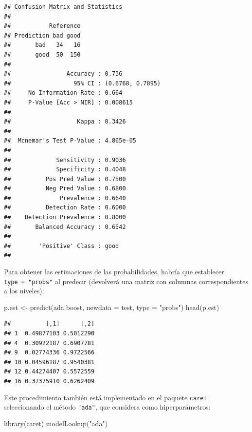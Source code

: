 \documentclass[
  spanish,
]{book}
\newenvironment{Shaded}{\begin{snugshade}}{\end{snugshade}}
\newcommand{\AttributeTok}[1]{\textcolor[rgb]{0.77,0.63,0.00}{#1}}
\newcommand{\FunctionTok}[1]{\textcolor[rgb]{0.00,0.00,0.00}{#1}}
\newcommand{\NormalTok}[1]{#1}
\newcommand{\OtherTok}[1]{\textcolor[rgb]{0.56,0.35,0.01}{#1}}
\newcommand{\StringTok}[1]{\textcolor[rgb]{0.31,0.60,0.02}{#1}}
\theoremstyle{break}
\theoremstyle{definition}
\theoremstyle{definition}
\theoremstyle{definition}
\theoremstyle{definition}
\theoremstyle{remark}
\begin{document}
\begin{verbatim}
## Confusion Matrix and Statistics
## 
##           Reference
## Prediction bad good
##       bad   34   16
##       good  50  150
##                                           
##                Accuracy : 0.736           
##                  95% CI : (0.6768, 0.7895)
##     No Information Rate : 0.664           
##     P-Value [Acc > NIR] : 0.008615        
##                                           
##                   Kappa : 0.3426          
##                                           
##  Mcnemar's Test P-Value : 4.865e-05       
##                                           
##             Sensitivity : 0.9036          
##             Specificity : 0.4048          
##          Pos Pred Value : 0.7500          
##          Neg Pred Value : 0.6800          
##              Prevalence : 0.6640          
##          Detection Rate : 0.6000          
##    Detection Prevalence : 0.8000          
##       Balanced Accuracy : 0.6542          
##                                           
##        'Positive' Class : good            
## 
\end{verbatim}

Para obtener las estimaciones de las probabilidades, habría que establecer \texttt{type\ =\ "probs"} al predecir (devolverá una matriz con columnas correspondientes a los niveles):

\begin{Shaded}
\begin{Highlighting}[]
\NormalTok{p.est }\OtherTok{\textless{}{-}} \FunctionTok{predict}\NormalTok{(ada.boost, }\AttributeTok{newdata =}\NormalTok{ test, }\AttributeTok{type =} \StringTok{"probs"}\NormalTok{)}
\FunctionTok{head}\NormalTok{(p.est)}
\end{Highlighting}
\end{Shaded}

\begin{verbatim}
##          [,1]      [,2]
## 1  0.49877103 0.5012290
## 4  0.30922187 0.6907781
## 9  0.02774336 0.9722566
## 10 0.04596187 0.9540381
## 12 0.44274407 0.5572559
## 16 0.37375910 0.6262409
\end{verbatim}

Este procedimiento también está implementado en el paquete \texttt{caret} seleccionando el método \texttt{"ada"}, que considera como hiperparámetros:

\begin{Shaded}
\begin{Highlighting}[]
\FunctionTok{library}\NormalTok{(caret)}
\FunctionTok{modelLookup}\NormalTok{(}\StringTok{"ada"}\NormalTok{)}
\end{Highlighting}
\end{Shaded}
\end{document}
